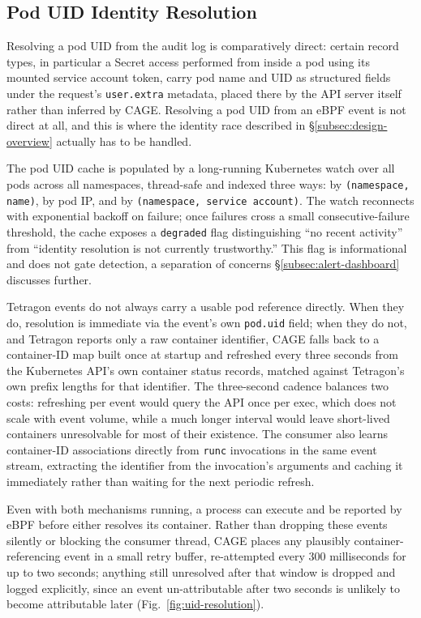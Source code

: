\documentclass{ieeeaccess}
\begin{document}
\subsection{Pod UID Identity Resolution}
\label{subsec:uid-resolution}

Resolving a pod UID from the audit log is comparatively direct: certain
record types, in particular a Secret access performed from inside a
pod using its mounted service account token, carry pod name and UID as
structured fields under the request's \texttt{user.extra} metadata, placed
there by the API server itself rather than inferred by CAGE. Resolving
a pod UID from an eBPF event is not direct at all, and this is where
the identity race described in \S\ref{subsec:design-overview} actually
has to be handled.

The pod UID cache is populated by a long-running Kubernetes watch over
all pods across all namespaces, thread-safe and indexed three ways: by
\texttt{(namespace, name)}, by pod IP, and by \texttt{(namespace, service account)}.
The watch reconnects with exponential backoff on failure; once
failures cross a small consecutive-failure threshold, the cache
exposes a \texttt{degraded} flag distinguishing ``no recent activity'' from
``identity resolution is not currently trustworthy.'' This flag is
informational and does not gate detection, a separation of concerns
\S\ref{subsec:alert-dashboard} discusses further.

Tetragon events do not always carry a usable pod reference directly.
When they do, resolution is immediate via the event's own \texttt{pod.uid}
field; when they do not, and Tetragon reports only a raw container
identifier, CAGE falls back to a container-ID map built once at
startup and refreshed every three seconds from the Kubernetes API's
own container status records, matched against Tetragon's own prefix
lengths for that identifier. The three-second cadence balances two
costs: refreshing per event would query the API once per exec, which
does not scale with event volume, while a much longer interval would
leave short-lived containers unresolvable for most of their existence.
The consumer also learns container-ID associations directly from
\texttt{runc} invocations in the same event stream, extracting the identifier
from the invocation's arguments and caching it immediately rather than
waiting for the next periodic refresh.

Even with both mechanisms running, a process can execute and be
reported by eBPF before either resolves its container. Rather than
dropping these events silently or blocking the consumer thread, CAGE
places any plausibly container-referencing event in a small retry
buffer, re-attempted every 300 milliseconds for up to two seconds;
anything still unresolved after that window is dropped and logged
explicitly, since an event un-attributable after two seconds is
unlikely to become attributable later (Fig.~\ref{fig:uid-resolution}).
\end{document}
